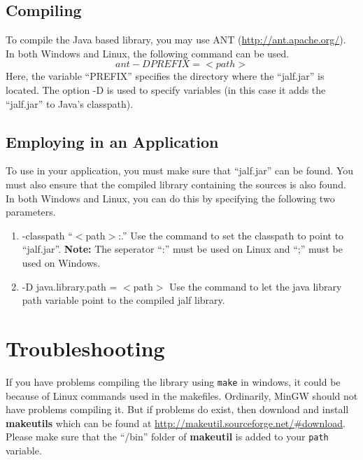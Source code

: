 \subsection*{Compiling \jalf}
To compile the Java based \jalf library, you may use ANT (\url{http://ant.apache.org/}). \vskip 1pt
In both Windows and Linux, the following command can be used.
\[
  ant -D PREFIX=<path>
\]
Here, the variable ``PREFIX'' specifies the directory where the ``jalf.jar'' is located. The option -D is used to specify variables (in this case it adds the ``jalf.jar'' to Java's classpath). \vskip 1pt

\subsection*{Employing \jalf in an Application}
To use \libalf in your application, you must make sure that ``jalf.jar'' can be found. You must also ensure that the compiled \jalf library containing the \libalf sources is also found.  \vskip 1pt
In both Windows and Linux, you can do this by specifying the following two parameters.
\begin{enumerate}
 \item -classpath ``$<$path$>$:.'' \vskip 1pt
	Use the command to set the classpath to point to ``jalf.jar''. \vskip 1pt
	\textbf{Note:} The seperator ``:'' must be used on Linux and ``;'' must be used on Windows.
 \item -D java.library.path = $<$path$>$ \vskip 1pt
	Use the command to let the java library path variable point to the compiled jalf library. 
\end{enumerate}

\section{Troubleshooting}
If you have problems compiling the library using \texttt{make} in windows, it could be because of Linux commands used in the makefiles. Ordinarily, MinGW should not have problems compiling it. But if problems do exist, then download and install \textbf{makeutils} which can be found at \url{http://makeutil.sourceforge.net/#download}. \vskip 1pt
Please make sure that the ``/bin'' folder of \textbf{makeutil} is added to your \texttt{path} variable. 

